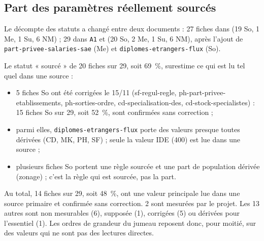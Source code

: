\subsection{Part des paramètres réellement sourcés}\label{par:sources}

Le décompte des statuts a changé entre deux documents : 27\mesure{} fiches dans  (19 So, 1 Me,
1 Su, 6 NM\mesure) ; 29\mesure{} dans \texttt{A1} et  (20 So, 2 Me, 1 Su, 6 NM\mesure),
après l'ajout de \texttt{part-privee-salaries-sae} (Me) et \texttt{diplomes-etrangers-flux} (So).

Le statut « sourcé » de 20\mesure{} fiches sur 29, soit 69~\%\derive, surestime ce qui est lu tel quel dans
une source :
\begin{itemize}
  \item 5\mesure{} fiches So ont été corrigées le 15/11 (sf-regul-regle, ph-part-privee-etablissements,
  ph-sorties-ordre, cd-specialisation-des, cd-stock-specialistes) : 15\derive{} fiches So sur 29, soit
  52~\%\derive, sont confirmées sans correction ;
  \item parmi elles, \texttt{diplomes-etrangers-flux} porte des valeurs presque toutes dérivées (CD, MK, PH,
  SF) ; seule la valeur IDE (400) est lue dans une source \citep{d-er1319} ;
  \item plusieurs fiches So portent une règle sourcée et une part de population dérivée (zonage) ; c'est la
  règle qui est sourcée, pas la part.
\end{itemize}
Au total, 14\derive{} fiches sur 29, soit 48~\%\derive, ont une valeur principale lue dans une source primaire
et confirmée sans correction. 2\mesure{} sont mesurées par le projet. Les 13\derive{} autres sont non
mesurables (6), supposée (1), corrigées (5) ou dérivées pour l'essentiel (1). Les ordres de grandeur du jumeau
reposent donc, pour moitié, sur des valeurs qui ne sont pas des lectures directes.
\endgroup
